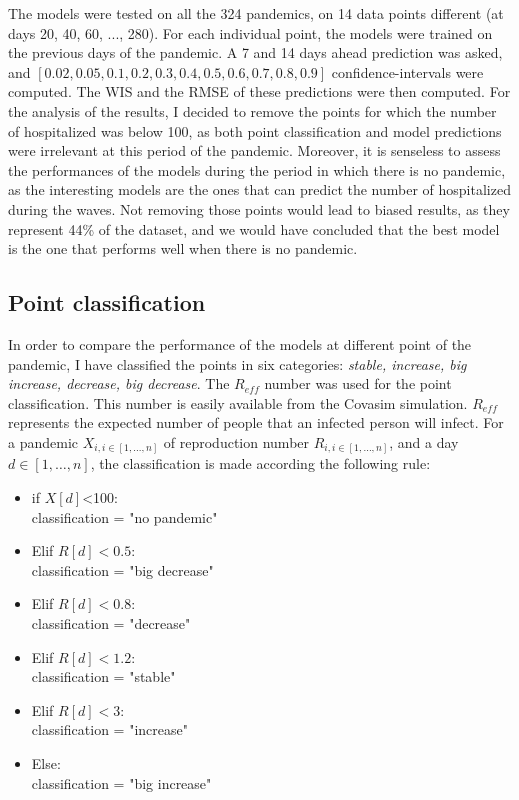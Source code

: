 The models were tested on all the 324 pandemics, on 14 data points different (at days 20, 40, 60, ..., 280). 
For each individual point, the models were trained on the previous days of the pandemic. 
A 7 and 14 days ahead prediction was asked, and $[0.02, 0.05, 0.1, 0.2, 0.3, 0.4, 0.5, 0.6, 0.7, 0.8, 0.9]$ confidence-intervals were computed. 
The WIS and the RMSE of these predictions were then computed. 
For the analysis of the results, I decided to remove the points for which the number of hospitalized was below 100, as both point classification and model predictions were irrelevant at this period of the pandemic.
Moreover, it is senseless to assess the performances of the models during the period in which there is no pandemic, as the interesting models are the ones that can predict the number of hospitalized during the waves.
Not removing those points would lead to biased results, as they represent 44\% of the dataset, and we would have concluded that the best model is the one that performs well when there is no pandemic. 
\subsection{Point classification}
\label{sec:classification}

In order to compare the performance of the models at different point of the pandemic, I have  classified the points in six categories: \textit{stable, increase, big increase, decrease, big decrease}.
The $R_{eff}$ number was used for the point classification. 
This number is easily available from the Covasim simulation. 
$R_{eff}$ represents the expected number of people that an infected person will infect.
For a pandemic $X_{i, i \in [1, ..., n]}$ of reproduction number $R_{i, i \in [1, ..., n]}$, and a day $d \in [1, \hdots, n]$, the classification is made according the following rule: \\
\begin{itemize}
    \item if $X[d]$<100: \\
    classification = "no pandemic"
    \item Elif $R[d] <0.5$: \\
    classification = "big decrease"
    \item Elif $R[d] < 0.8$: \\
    classification = "decrease"
    \item Elif $R[d] < 1.2$: \\
    classification = "stable" 
    \item Elif $R[d] < 3$: \\
    classification = "increase"
    \item Else: \\
    classification = "big increase"
\end{itemize}


